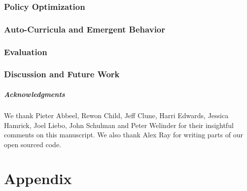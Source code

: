 \documentclass{article} %
\begin{document}
\section{Policy Optimization}


\section{Auto-Curricula and Emergent Behavior}


\section{Evaluation}


\section{Discussion and Future Work}


\subsubsection*{Acknowledgments}

We thank Pieter Abbeel, Rewon Child, Jeff Clune, Harri Edwards, Jessica Hamrick, Joel Liebo, John Schulman and Peter Welinder for their insightful comments on this manuscript. We also thank Alex Ray for writing parts of our open sourced code.




\appendix
\newpage
{} %
\part{Appendix} %
\parttoc %
\newpage

\renewcommand\thefigure{\thesection.\arabic{figure}}    
\setcounter{figure}{0}    
\renewcommand\thetable{\thesection.\arabic{table}}    
\setcounter{table}{0}


\setcounter{figure}{0}
\setcounter{table}{0}

\setcounter{figure}{0}
\setcounter{table}{0}

\setcounter{figure}{0}  
\setcounter{table}{0}

\end{document}
